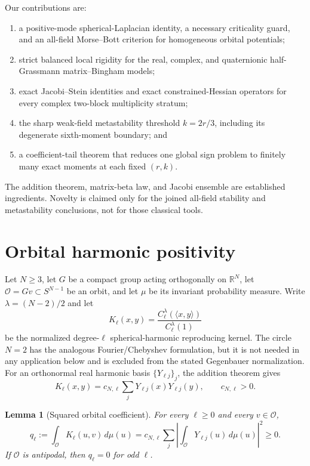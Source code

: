 \documentclass[11pt]{article}
\newtheorem{lemma}[theorem]{Lemma}
\newcommand{\R}{\mathbb R}
\newcommand{\cO}{\mathcal O}
\newcommand{\ip}[2]{\langle #1,#2\rangle}
\begin{document}
Our contributions are:
\begin{enumerate}[label=(\roman*)]
\item a positive-mode spherical-Laplacian identity, a necessary criticality
guard, and an all-field Morse--Bott criterion for homogeneous orbital
potentials;
\item strict balanced local rigidity for the real, complex, and quaternionic
half-Grassmann matrix--Bingham models;
\item exact Jacobi--Stein identities and exact constrained-Hessian operators
for every complex two-block multiplicity stratum;
\item the sharp weak-field metastability threshold $k=2r/3$, including its
degenerate sixth-moment boundary; and
\item a coefficient-tail theorem that reduces one global sign problem to
finitely many exact moments at each fixed $(r,k)$.
\end{enumerate}
The addition theorem, matrix-beta law, and Jacobi ensemble are established
ingredients.  Novelty is claimed only for the joined all-field stability and
metastability conclusions, not for those classical tools.

\section{Orbital harmonic positivity}

Let $N\ge3$, let $G$ be a compact group acting orthogonally on $\R^N$, let
$\cO=Gv\subset S^{N-1}$ be an orbit, and let $\mu$ be its invariant
probability measure.  Write $\lambda=(N-2)/2$ and let
\[
 K_\ell(x,y)=\frac{C_\ell^\lambda(\ip{x}{y})}
 {C_\ell^\lambda(1)}                                      \tag{2.1}
\]
be the normalized degree-$\ell$ spherical-harmonic reproducing kernel.
The circle $N=2$ has the analogous Fourier/Chebyshev formulation, but it is
not needed in any application below and is excluded from the stated
Gegenbauer normalization.
For an orthonormal real harmonic basis $\{Y_{\ell j}\}_j$, the addition
theorem gives
\[
 K_\ell(x,y)=c_{N,\ell}\sum_jY_{\ell j}(x)Y_{\ell j}(y),
 \qquad c_{N,\ell}>0.                                     \tag{2.2}
\]

\begin{lemma}[Squared orbital coefficient]\label{lem:square}
For every $\ell\ge0$ and every $v\in\cO$,
\[
 q_\ell:=\int_\cO K_\ell(u,v)\,d\mu(u)
 =c_{N,\ell}\sum_j\left|\int_\cO Y_{\ell j}(u)\,d\mu(u)\right|^2
 \ge0.                                                     \tag{2.3}
\]
If $\cO$ is antipodal, then $q_\ell=0$ for odd $\ell$.
\end{lemma}
\end{document}
